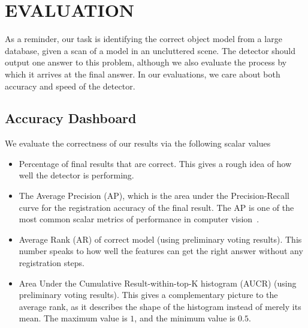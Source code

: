 \section{EVALUATION}

As a reminder, our task is identifying the correct object model from a large database, given a scan of a model in an uncluttered scene.
The detector should output one answer to this problem, although we also evaluate the process by which it arrives at the final answer.
In our evaluations, we care about both accuracy and speed of the detector.

\subsection{Accuracy Dashboard}

We evaluate the correctness of our results via the following scalar values
\begin{itemize}
  \item Percentage of final results that are correct. This gives a rough idea of how well the detector is performing.
  \item The Average Precision (AP), which is the area under the Precision-Recall curve for the registration accuracy of the final result. The AP is one of the most common scalar metrics of performance in computer vision~\cite{pascal-voc-2010}.
  \item Average Rank (AR) of correct model (using preliminary voting results). This number speaks to how well the features can get the right answer without any registration steps.
  \item Area Under the Cumulative Result-within-top-K histogram (AUCR) (using preliminary voting results). This gives a complementary picture to the average rank, as it describes the shape of the histogram instead of merely its mean. The maximum value is $1$, and the minimum value is $0.5$.
\end{itemize}

